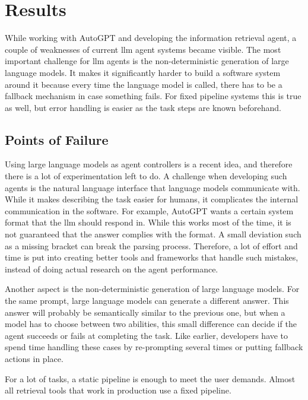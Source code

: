 \documentclass[../main.tex]{subfiles}
\begin{document}
\chapter{Results}
\label{ch:results}

While working with AutoGPT and developing the information retrieval agent,
a couple of weaknesses of current \gls{llm} agent systems became visible.
The most important challenge for \gls{llm} agents is the non-deterministic generation of large language models.
It makes it significantly harder to build a software system around it because every time the language model is called,
there has to be a fallback mechanism in case something fails.
For fixed pipeline systems this is true as well,
but error handling is easier as the task steps are known beforehand.

\section{Points of Failure}

Using large language models as agent controllers is a recent idea, and therefore there is a lot of experimentation left to do.
A challenge when developing such agents is the natural language interface that language models communicate with.
While it makes describing the task easier for humans, it complicates the internal communication in the software.
For example, AutoGPT wants a certain system format that the \gls{llm} should respond in.
While this works most of the time, it is not guaranteed that the answer complies with the format.
A small deviation such as a missing bracket can break the parsing process.
Therefore, a lot of effort and time is put into creating better tools and frameworks that handle such mistakes,
instead of doing actual research on the agent performance.

Another aspect is the non-deterministic generation of large language models. %
For the same prompt, large language models can generate a different answer.
This answer will probably be semantically similar to the previous one,
but when a model has to choose between two abilities,
this small difference can decide if the agent succeeds or fails at completing the task.
Like earlier, developers have to spend time handling these cases by re-prompting several times or putting fallback actions in place.

For a lot of tasks, a static pipeline is enough to meet the user demands.
Almost all retrieval tools that work in production use a fixed pipeline.
\end{document}

